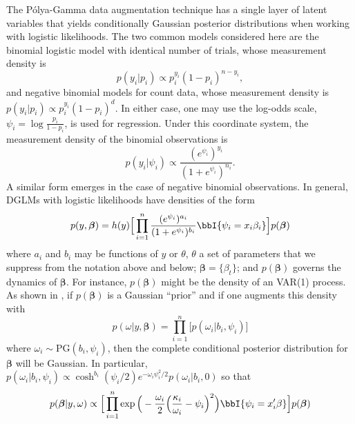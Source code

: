 \documentclass[11pt]{article}
\newcommand{\Polya}{P\'{o}lya}
\newcommand{\PG}{\text{PG}}
\newcommand{\bbeta}{\boldsymbol{\beta}}
\begin{document}
The \Polya-Gamma data augmentation technique has a single layer of latent
variables that yields conditionally Gaussian posterior distributions when
working with logistic likelihoods.  The two common models considered here are
the binomial logistic model with identical number of trials, whose measurement
density is
\[
p(y_i | p_i) \propto p_i^{y_i} (1-p_i)^{n - y_i},
\]
and negative binomial models for count data, whose measurement density is \(
p(y_i | p_i) \propto p_i^{y_i} (1-p_i)^{d}.  \) In either case, one may use the
log-odds scale, $\psi_i = \log \frac{p_i}{1-p_i}$, is used for regression.
Under this coordinate system, the measurement density of the binomial
observations is
\[
p(y_i | \psi_i) \propto \frac{(e^{\psi_i})^{y_i}}{(1+e^{\psi_i})^{n_i}}.
\]
A similar form emerges in the case of negative binomial observations.  In
general, DGLMs with logistic likelihoods have densities of the form
\[
p(y, \bbeta) = h(y) \Big[ \prod_{i=1}^n
\frac{(e^{\psi_i})^{a_i}}{(1+e^{\psi_i})^{b_i}} \bbI \{\psi_i = x_i \beta_i\}
\Big] p(\bbeta)
\]
where $a_i$ and $b_i$ may be functions of $y$ or $\theta$, $\theta$ a set of
parameters that we suppress from the notation above and below; $\bbeta =
\{\beta_t\}$; and $p(\bbeta)$ governs the dynamics of $\bbeta$.  For instance,
$p(\bbeta)$ might be the density of an VAR(1) process.  As shown in
\cite{polson-etal-2012}, if $p(\bbeta)$ is a Gaussian ``prior'' and if one
augments this density with
\begin{equation}
\label{eqn:augmentation}
p(\omega | y, \bbeta) = \prod_{i=1}^n \Big[ p(\omega_i | b_i, \psi_i)
\Big]
\end{equation}
where $\omega_i \sim \PG(b_i, \psi_i)$, then the complete conditional posterior
distribution for $\bbeta$ will be Gaussian.  In particular, $p(\omega_i | b_i,
\psi_i) \propto \cosh^{b_i}(\psi_i/2) e^{-\omega_i \psi_i^2 / 2} p(\omega_i |
b_i, 0)$ so that
\[
p(\bbeta | y, \omega) 
\propto 
\Big[ \prod_{i=1}^n \exp 
\Big(-\frac{\omega_i}{2} \Big(\frac{\kappa_i}{\omega_i} - \psi_i\Big)^2 \Big)
\bbI \{\psi_i = x_i' \beta\} \Big] p(\bbeta)
\]
\end{document}
